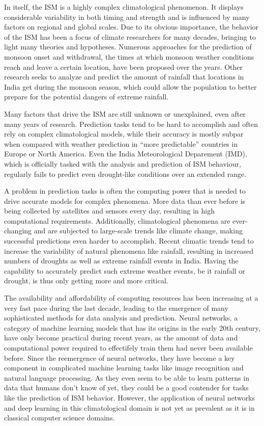 In itself, the ISM is a highly complex climatological phenomenon. It displays considerable variability in both timing and strength and is influenced by many factors on regional and global scales. Due to its obvious importance, the behavior of the ISM has been a focus of climate researchers for many decades, bringing to light many theories and hypotheses. Numerous approaches for the prediction of monsoon onset and withdrawal, the times at which monsoon weather conditions reach and leave a certain location, have been proposed over the years. Other research seeks to analyze and predict the amount of rainfall that locations in India get during the monsoon season, which could allow the population to better prepare for the potential dangers of extreme rainfall.

Many factors that drive the ISM are still unknown or unexplained, even after many years of research. Prediction tasks tend to be hard to accomplish and often rely on complex climatological models, while their accuracy is mostly subpar when compared with weather prediction in ``more predictable'' countries in Europe or North America. Even the India Meteorological Deparement (IMD), which is officially tasked with the analysis and prediction of ISM behaviour, regularly fails to predict even drought-like conditions \citep{arg} over an extended range.

A problem in prediction tasks is often the computing power that is needed to drive accurate models for complex phenomena. More data than ever before is being collected by satellites and sensors every day, resulting in high computational requirements. Additionally, climatological phenomena are ever-changing and are subjected to large-scale trends like climate change, making successful predictions even harder to accomplish. Recent climatic trends tend to increase the variability of natural phenomena like rainfall, resulting in increased numbers of droughts as well as extreme rainfall events in India. Having the capability to accurately predict such extreme weather events, be it rainfall or drought, is thus only getting more and more critical.

The availability and affordability of computing resources has been increasing at a very fast pace during the last decade, leading to the emergence of many sophisticated methods for data analysis and prediction. Neural networks, a category of machine learning models that has its origins in the early 20th century, have only become practical during recent years, as the amount of data and computational power required to effectifely train them had never been available before. Since the reemergence of neural networks, they have become a key component in complicated machine learning tasks like image recognition and natural language processing. As they even seem to be able to learn patterns in data that humans don't know of yet, they could be a good contender for tasks like the prediction of ISM behavior. However, the application of neural networks and deep learning in this climatological domain is not yet as prevalent as it is in classical computer science domains.

